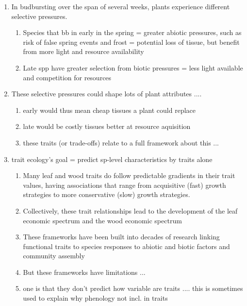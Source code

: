\documentclass{article}
\begin{document}
\begin{enumerate}
\begin{enumerate}
\end{enumerate}

\item In budbursting over the span of several weeks, plants experience different selective pressures.  %
\begin{enumerate}
\item Species that bb in early in the spring = greater abiotic pressures, such as risk of false spring events and frost = potential loss of tissue, but benefit from more light and resource availability
\item Late spp have greater selection from biotic pressures = less light available and competition for resources 
\end{enumerate}

\item These selective pressures could shape lots of plant attributes .... 
\begin{enumerate}
\item early would thus mean cheap tissues a plant could replace
\item late would be costly tissues better at resource aquisition
\item these traits (or trade-offs) relate to a full framework about this ... 
\end{enumerate}

\item trait ecology’s goal = predict sp-level characteristics by traits alone %
\begin{enumerate}
\item Many leaf and wood traits do follow predictable gradients in their trait values, having associations that range from acquisitive (fast) growth strategies to more conservative (slow) growth strategies.
\item Collectively, these trait relationships lead to the development of the leaf economic spectrum and the wood economic spectrum
\item These frameworks have been built into decades of research linking functional traits to species responses to abiotic and biotic factors and community assembly
\item But these frameworks have limitations ... 
\item one is that they don't predict how variable are traits .... this is sometimes used to explain why phenology not incl. in traits %
\end{enumerate}


\end{enumerate}
\end{document}
